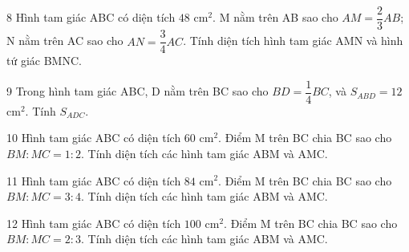 \gap
\begin{probbox}{8}{\relax}
Hình tam giác ABC có diện tích $48$ cm$^2$. M nằm trên AB sao cho $AM=\dfrac23AB$; N nằm trên AC sao cho $AN=\dfrac34AC$. Tính diện tích hình tam giác AMN và hình tứ giác BMNC.
\end{probbox}
\gap
\begin{probbox}{9}{\relax}
Trong hình tam giác ABC, D nằm trên BC sao cho $BD=\dfrac14BC$, và $S_{ABD}=12$ cm$^2$. Tính $S_{ADC}$.
\end{probbox}
\gap
\begin{probbox}{10}{\relax}
Hình tam giác ABC có diện tích $60$ cm$^2$. Điểm M trên BC chia BC sao cho $BM:MC=1:2$. Tính diện tích các hình tam giác ABM và AMC.
\end{probbox}
\gap
\begin{probbox}{11}{\relax}
Hình tam giác ABC có diện tích $84$ cm$^2$. Điểm M trên BC chia BC sao cho $BM:MC=3:4$. Tính diện tích các hình tam giác ABM và AMC.
\end{probbox}
\gap
\begin{probbox}{12}{\relax}
Hình tam giác ABC có diện tích $100$ cm$^2$. Điểm M trên BC chia BC sao cho $BM:MC=2:3$. Tính diện tích các hình tam giác ABM và AMC.
\end{probbox}
